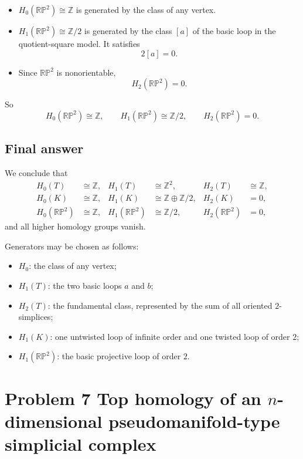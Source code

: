 \documentclass[12pt,a4paper]{article}
\theoremstyle{notespace}
\begin{document}
\begin{itemize}
	\item \(H_0(\mathbb{RP}^2)\cong \mathbb Z\) is generated by the class of any vertex.
	\item \(H_1(\mathbb{RP}^2)\cong \mathbb Z/2\) is generated by the class \([a]\) of the basic loop in the quotient-square model. It satisfies
	\[
	2[a]=0.
	\]
	\item Since \(\mathbb{RP}^2\) is nonorientable,
	\[
	H_2(\mathbb{RP}^2)=0.
	\]
\end{itemize}

So
\[
H_0(\mathbb{RP}^2)\cong \mathbb Z,\qquad
H_1(\mathbb{RP}^2)\cong \mathbb Z/2,\qquad
H_2(\mathbb{RP}^2)=0.
\]

\subsection{Final answer}

We conclude that
\[
\boxed{
	\begin{aligned}
		H_0(T)&\cong \mathbb Z, &
		H_1(T)&\cong \mathbb Z^2, &
		H_2(T)&\cong \mathbb Z,\\[0.5ex]
		H_0(K)&\cong \mathbb Z, &
		H_1(K)&\cong \mathbb Z\oplus \mathbb Z/2, &
		H_2(K)&=0,\\[0.5ex]
		H_0(\mathbb{RP}^2)&\cong \mathbb Z, &
		H_1(\mathbb{RP}^2)&\cong \mathbb Z/2, &
		H_2(\mathbb{RP}^2)&=0,
\end{aligned}}
\]
and all higher homology groups vanish.

Generators may be chosen as follows:

\begin{itemize}
	\item \(H_0\): the class of any vertex;
	\item \(H_1(T)\): the two basic loops \(a\) and \(b\);
	\item \(H_2(T)\): the fundamental class, represented by the sum of all oriented \(2\)-simplices;
	\item \(H_1(K)\): one untwisted loop of infinite order and one twisted loop of order \(2\);
	\item \(H_1(\mathbb{RP}^2)\): the basic projective loop of order \(2\).
\end{itemize}

\bigskip

\section{Problem 7 Top homology of an \(n\)-dimensional pseudomanifold-type simplicial complex}
\end{document}
